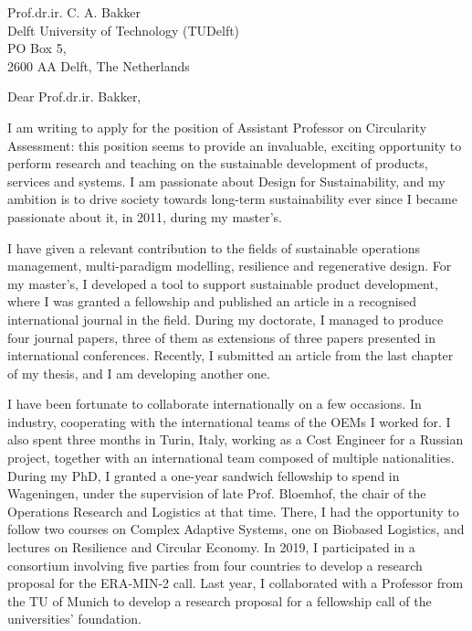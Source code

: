 \documentclass[sender,
    paper=a4,
    version=last,
    fontsize=12pt,
    DIV=12,
    BCOR=0mm]{scrlttr2}
\begin{document}

\begin{letter}{
    Prof.dr.ir. C. A. Bakker \\
    Delft University of Technology (TUDelft)\\
    PO Box 5, \\
    2600 AA Delft, The Netherlands
} 

\opening{Dear Prof.dr.ir. Bakker,}


\parindent8mm

I am writing to apply for the position of Assistant Professor on Circularity Assessment: this position seems to provide an invaluable, exciting opportunity to perform research and teaching on the sustainable development of products, services and systems. I am passionate about Design for Sustainability, and my ambition is to drive society towards long-term sustainability ever since I became passionate about it, in 2011, during my master's.

I have given a relevant contribution to the fields of sustainable operations management, multi-paradigm modelling, resilience and regenerative design. For my master's, I developed a tool to support sustainable product development, where I was granted a fellowship and published an article in a recognised international journal in the field. During my doctorate, I managed to produce four journal papers, three of them as extensions of three papers presented in international conferences. Recently, I submitted an article from the last chapter of my thesis, and I am developing another one.

I have been fortunate to collaborate internationally on a few occasions. In industry, cooperating with the international teams of the OEMs I worked for. I also spent three months in Turin, Italy, working as a Cost Engineer for a Russian project, together with an international team composed of multiple nationalities. During my PhD, I granted a one-year sandwich fellowship to spend in Wageningen, under the supervision of late Prof. Bloemhof, the chair of the Operations Research and Logistics at that time. There, I had the opportunity to follow two courses on Complex Adaptive Systems, one on Biobased Logistics, and lectures on Resilience and Circular Economy. In 2019, I participated in a consortium involving five parties from four countries to develop a research proposal for the ERA-MIN-2 call. Last year, I collaborated with a Professor from the TU of Munich to develop a research proposal for a fellowship call of the universities' foundation.


\end{letter}
\end{document}
